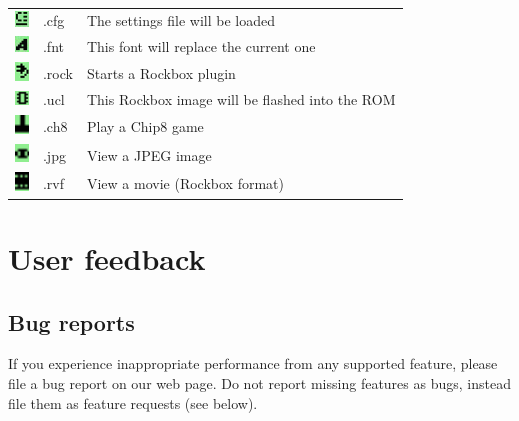\begin{center}
\begin{tabular}{lll}
\includegraphics[width=0.37cm]{appendix/images/icon-config.png} & .cfg & The settings file will be loaded\\
\includegraphics[width=0.37cm]{appendix/images/icon-font.png} & .fnt & This font will replace the current one\\
\includegraphics[width=0.37cm]{appendix/images/icon-rock.png} & .rock & Starts a Rockbox plugin\\
\includegraphics[width=0.37cm]{appendix/images/icon-ucl.png} & .ucl & This Rockbox image will be flashed into the ROM \\
\includegraphics[width=0.37cm]{appendix/images/icon-chip8.png} & .ch8 & Play a Chip8 game \\
\includegraphics[width=0.37cm]{appendix/images/icon-image-file.png} & .jpg & View a JPEG image \\
\includegraphics[width=0.37cm]{appendix/images/icon-movie-file.png} & .rvf & View a movie (Rockbox format)\\\bottomrule
\end{tabular}
\end{center}

\chapter{User feedback}
\section{Bug reports}
If you experience inappropriate performance from any supported feature,
please file a bug report on our web page. Do not report missing
features as bugs, instead file them as feature requests (see below).

